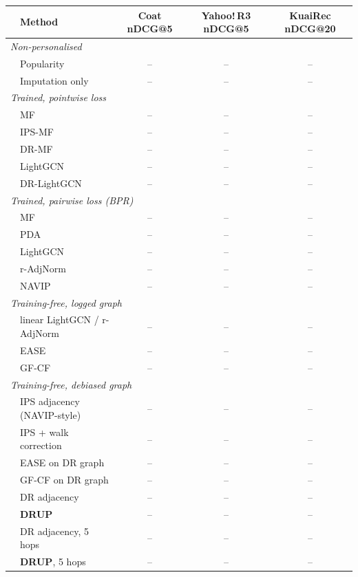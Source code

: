 \begin{tabular}{llccc}
\toprule
 & Method & Coat nDCG@5 & Yahoo!\,R3 nDCG@5 & KuaiRec nDCG@20\\
\midrule
\multicolumn{5}{l}{\emph{Non-personalised}}\\
 & Popularity & -- & -- & --\\
 & Imputation only & -- & -- & --\\
\multicolumn{5}{l}{\emph{Trained, pointwise loss}}\\
 & MF & -- & -- & --\\
 & IPS-MF & -- & -- & --\\
 & DR-MF & -- & -- & --\\
 & LightGCN & -- & -- & --\\
 & DR-LightGCN & -- & -- & --\\
\multicolumn{5}{l}{\emph{Trained, pairwise loss (BPR)}}\\
 & MF & -- & -- & --\\
 & PDA & -- & -- & --\\
 & LightGCN & -- & -- & --\\
 & r-AdjNorm & -- & -- & --\\
 & NAVIP & -- & -- & --\\
\multicolumn{5}{l}{\emph{Training-free, logged graph}}\\
 & linear LightGCN / r-AdjNorm & -- & -- & --\\
 & EASE & -- & -- & --\\
 & GF-CF & -- & -- & --\\
\multicolumn{5}{l}{\emph{Training-free, debiased graph}}\\
 & IPS adjacency (NAVIP-style) & -- & -- & --\\
 & IPS + walk correction & -- & -- & --\\
 & EASE on DR graph & -- & -- & --\\
 & GF-CF on DR graph & -- & -- & --\\
 & DR adjacency & -- & -- & --\\
 & \textbf{DRUP} & -- & -- & --\\
 & DR adjacency, 5 hops & -- & -- & --\\
 & \textbf{DRUP}, 5 hops & -- & -- & --\\
\bottomrule
\end{tabular}
